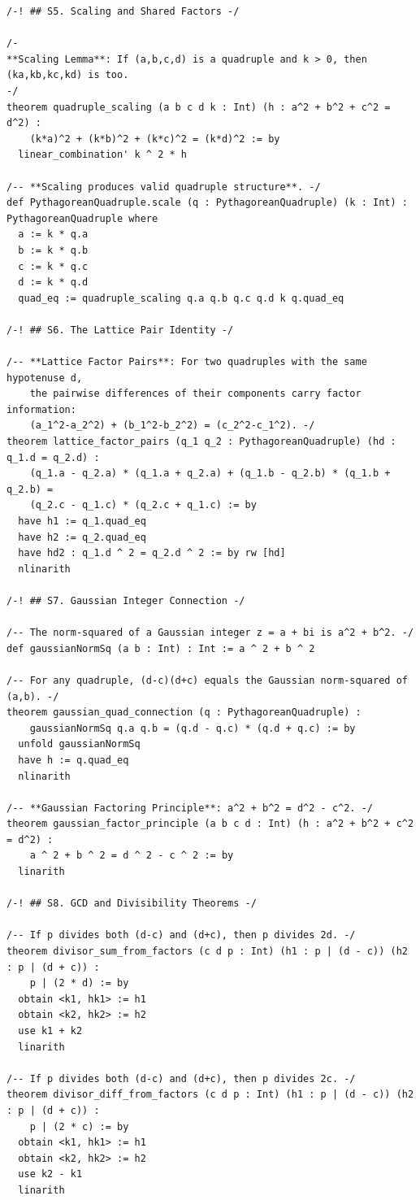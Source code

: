 \documentclass[11pt,openright,twoside]{book}
\theoremstyle{definition}
\begin{document}
\begin{lstlisting}[style=lean]
/-! ## S5. Scaling and Shared Factors -/

/-
**Scaling Lemma**: If (a,b,c,d) is a quadruple and k > 0, then (ka,kb,kc,kd) is too.
-/
theorem quadruple_scaling (a b c d k : Int) (h : a^2 + b^2 + c^2 = d^2) :
    (k*a)^2 + (k*b)^2 + (k*c)^2 = (k*d)^2 := by
  linear_combination' k ^ 2 * h

/-- **Scaling produces valid quadruple structure**. -/
def PythagoreanQuadruple.scale (q : PythagoreanQuadruple) (k : Int) : PythagoreanQuadruple where
  a := k * q.a
  b := k * q.b
  c := k * q.c
  d := k * q.d
  quad_eq := quadruple_scaling q.a q.b q.c q.d k q.quad_eq

/-! ## S6. The Lattice Pair Identity -/

/-- **Lattice Factor Pairs**: For two quadruples with the same hypotenuse d,
    the pairwise differences of their components carry factor information:
    (a_1^2-a_2^2) + (b_1^2-b_2^2) = (c_2^2-c_1^2). -/
theorem lattice_factor_pairs (q_1 q_2 : PythagoreanQuadruple) (hd : q_1.d = q_2.d) :
    (q_1.a - q_2.a) * (q_1.a + q_2.a) + (q_1.b - q_2.b) * (q_1.b + q_2.b) =
    (q_2.c - q_1.c) * (q_2.c + q_1.c) := by
  have h1 := q_1.quad_eq
  have h2 := q_2.quad_eq
  have hd2 : q_1.d ^ 2 = q_2.d ^ 2 := by rw [hd]
  nlinarith

/-! ## S7. Gaussian Integer Connection -/

/-- The norm-squared of a Gaussian integer z = a + bi is a^2 + b^2. -/
def gaussianNormSq (a b : Int) : Int := a ^ 2 + b ^ 2

/-- For any quadruple, (d-c)(d+c) equals the Gaussian norm-squared of (a,b). -/
theorem gaussian_quad_connection (q : PythagoreanQuadruple) :
    gaussianNormSq q.a q.b = (q.d - q.c) * (q.d + q.c) := by
  unfold gaussianNormSq
  have h := q.quad_eq
  nlinarith

/-- **Gaussian Factoring Principle**: a^2 + b^2 = d^2 - c^2. -/
theorem gaussian_factor_principle (a b c d : Int) (h : a^2 + b^2 + c^2 = d^2) :
    a ^ 2 + b ^ 2 = d ^ 2 - c ^ 2 := by
  linarith

/-! ## S8. GCD and Divisibility Theorems -/

/-- If p divides both (d-c) and (d+c), then p divides 2d. -/
theorem divisor_sum_from_factors (c d p : Int) (h1 : p | (d - c)) (h2 : p | (d + c)) :
    p | (2 * d) := by
  obtain <k1, hk1> := h1
  obtain <k2, hk2> := h2
  use k1 + k2
  linarith

/-- If p divides both (d-c) and (d+c), then p divides 2c. -/
theorem divisor_diff_from_factors (c d p : Int) (h1 : p | (d - c)) (h2 : p | (d + c)) :
    p | (2 * c) := by
  obtain <k1, hk1> := h1
  obtain <k2, hk2> := h2
  use k2 - k1
  linarith


\end{lstlisting}
\end{document}
